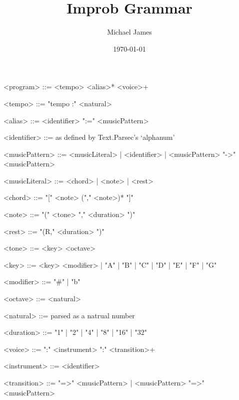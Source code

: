 \documentclass{article}
\title{ Improb Grammar}
\author{Michael James}
\date{\today}
\begin{document}
\maketitle
\thispagestyle{empty}

\begin{grammar}
<program> ::= <tempo> <alias>* <voice>+

<tempo> ::= "tempo :" <natural>

<alias> ::= <identifier> ":=" <musicPattern>

<identifier> ::= as defined by Text.Parsec's `alphanum'

<musicPattern> ::= <musicLiteral> | <identifier> | <musicPattern> "->" <musicPattern>

<musicLiteral> ::= <chord> | <note> | <rest>

<chord> ::= "[" <note> ("," <note>)* "]"

<note> ::= "(" <tone> "," <duration> ")"

<rest> ::= "(R," <duration> ")" 

<tone> ::= <key> <octave>

<key> ::= <key> <modifier> | "A" | "B" | "C" | "D" | "E" | "F" | "G"

<modifier> ::= "#" | "b"

<octave> ::= <natural>

<natural> ::= parsed as a natrual number

<duration> ::= "1" | "2" | "4" | "8" | "16" | "32"

<voice> ::= ":" <instrument> ":" <transition>+

<instrument> ::= <identifier>

<transition> ::= "=>" <musicPattern> | <musicPattern> "=>" <musicPattern>

\end{grammar}
\end{document}
